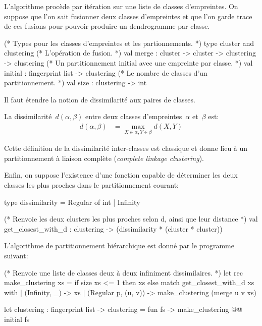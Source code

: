 L'algorithme procède par itération sur une liste de classes
d'empreintes. On suppose que l'on sait fusionner deux classes
d'empreintes et que l'on garde trace de ces fusions pour pouvoir
produire un dendrogramme par classe.

\begin{ocaml}
(* Types pour les classes d'empreintes et les partionnements. *)
type cluster and clustering
(* L'opération de fusion. *)
val merge : cluster -> cluster -> clustering -> clustering
(* Un partitionnement initial avec une empreinte par classe. *)
val initial : fingerprint list -> clustering
(* Le nombre de classes d'un partitionnement. *)
val size : clustering -> int
\end{ocaml}

Il faut étendre la notion de dissimilarité aux paires de classes.

\begin{defn}
La dissimilarité~$d(\alpha, \beta)$ entre deux classes
d'empreintes~$\alpha$ et~$\beta$ est:
\begin{align*}
d(\alpha,\beta) &= \max\limits_{X \in \alpha, Y \in \beta} d(X,Y)
\end{align*}
\end{defn}

Cette définition de la dissimilarité inter-classes est classique et
donne lieu à un partitionnement à liaison complète (\emph{complete
  linkage clustering}).

Enfin, on suppose l'existence d'une fonction capable de déterminer
les deux classes les plus proches dans le partitionnement courant:

\begin{ocaml}
type dissimilarity = Regular of int | Infinity

(* Renvoie les deux clusters les plus proches selon d, ainsi que leur distance *)
val get_closest_with_d : clustering -> (dissimilarity * (cluster * cluster))
\end{ocaml}

L'algorithme de partitionnement hiérarchique est donné par le programme {\OCaml} suivant:

\begin{ocaml}
(* Renvoie une liste de classes deux à deux infiniment dissimilaires. *)
let rec make_clustering xs =
  if size xs <= 1 then xs
  else match get_closest_with_d xs with
   | (Infinity, _) -> xs
   | (Regular p, (u, v)) -> make_clustering (merge u v xs)

let clustering : fingerprint list -> clustering = fun fs ->
  make_clustering @@ initial fs
\end{ocaml}

